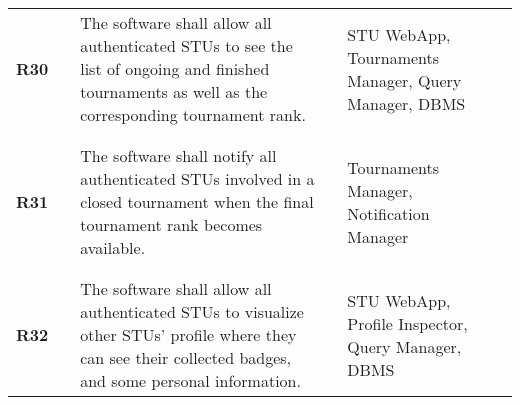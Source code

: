 \begin{longtable}[H]{l l p{6cm} l p{4cm} l}
    \textbf{R30}            & \vline & The software shall allow all authenticated STUs to see the list of ongoing and finished tournaments as well as the corresponding tournament rank.                                                                                                                            & \vline &  STU WebApp, Tournaments Manager, Query Manager, DBMS \\          
                            &        &                                                                                                                                                                                                                                                                              &        &       \\\hline  & & \\ 
    \textbf{R31}            & \vline & The software shall notify all authenticated STUs involved in a closed tournament when the final tournament rank becomes available.                                                                                                                                           & \vline &  Tournaments Manager, Notification Manager \\          
                            &        &                                                                                                                                                                                                                                                                              &        &       \\\hline  & & \\ 
    \textbf{R32}            & \vline & The software shall allow all authenticated STUs to visualize other STUs' profile where they can see their collected badges, and some personal information.                                                                                                                   & \vline &  STU WebApp, Profile Inspector, Query Manager, DBMS \\          
 \hline
\end{longtable}
